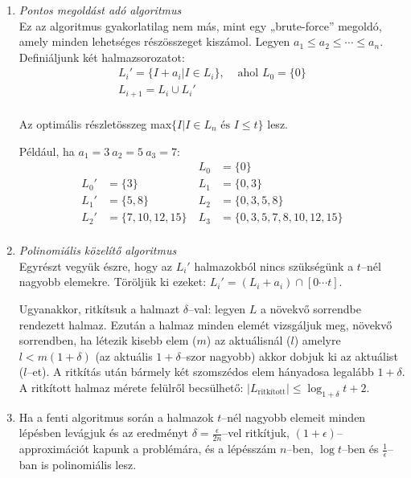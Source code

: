 \begin{enumerate}
	\item \emph{Pontos megoldást adó algoritmus}\\
	      Ez az algoritmus gyakorlatilag nem más, mint egy „brute-force” megoldó, amely
	      minden lehetséges részösszeget kiszámol. Legyen $a_1 \leq a_2 \leq \cdots \leq
		      a_n$. Definiáljunk két halmazsorozatot:
	      \begin{align*}
		      L_i' = \{ I + a_i | I \in L_i\}, & \mbox{ ahol } L_0 = \{ 0\} \\
		      L_{i+1}=L_i \cup L_i'            &                            \\
	      \end{align*}

	      Az optimális részletösszeg max$\{I|I \in L_n \mbox{ és } I \leq t\}$ lesz.

	      Például, ha $a_1=3~a_2=5~a_3=7$:
	      {
		      \begin{align*}
			           &                       & ~L_0  & = \{ 0 \}                        \\
			      L_0' & = \{ 3 \}             & ~ L_1 & = \{ 0, 3\}                      \\
			      L_1' & = \{ 5,8 \}           & ~ L_2 & = \{ 0, 3, 5, 8\}                \\
			      L_2' & = \{ 7, 10, 12, 15 \} & ~ L_3 & = \{ 0, 3, 5, 7, 8, 10, 12, 15\} \\
		      \end{align*}}
	\item \emph{Polinomiális közelítő algoritmus} \\
	      Egyrészt vegyük észre, hogy az $L_i'$ halmazokból nincs szükségünk a $t$--nél
	      nagyobb elemekre. Töröljük ki ezeket: $L_i' = (L_i+a_i) \cap [0 \cdots t]$.

	      Ugyanakkor, ritkítsuk a halmazt $\delta$--val: legyen $L$ a növekvő sorrendbe
	      rendezett halmaz. Ezután a halmaz minden elemét vizsgáljuk meg, növekvő
	      sorrendben, ha létezik kisebb elem ($m$) az aktuálisnál ($l$) amelyre
	      $l<m(1+\delta)$ (az aktuális $1+\delta$--szor nagyobb) akkor dobjuk ki az
	      aktuálist ($l$--et). A ritkítás után bármely két szomszédos elem hányadosa
	      legalább $1+\delta$. A ritkított halmaz mérete felülről becsülhető:
	      $|L_{\mbox{ritkított}}| \leq \log_{1+\delta}{t+2}$.
	\item Ha a fenti algoritmus során a halmazok $t$--nél nagyobb elemeit minden
	      lépésben levágjuk és az eredményt $\delta = \frac{\epsilon}{2n}$--vel
	      ritkítjuk, $(1+\epsilon)$--approximációt kapunk a problémára, és a lépésszám
	      $n$--ben, $\log t$--ben és $\frac{1}{\epsilon}$--ban is polinomiális lesz.
\end{enumerate}

